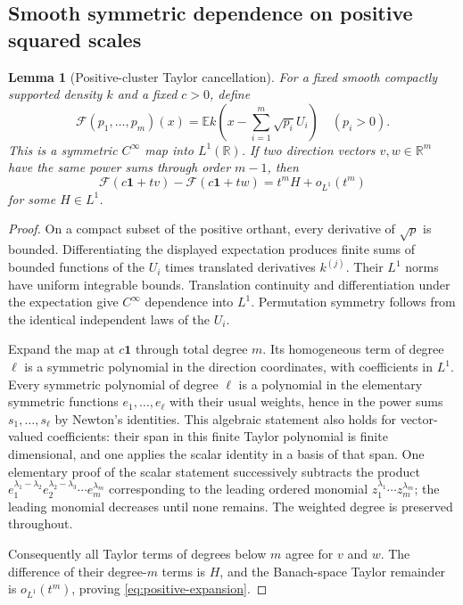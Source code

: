 \documentclass[11pt,a4paper]{article}
\numberwithin{equation}{section}
\newtheorem{lemma}[lemma]{Lemma}
\theoremstyle{definition}
\theoremstyle{remark}
\newcommand{\R}{\mathbb R}
\newcommand{\E}{\mathbb E}
\begin{document}
\subsection{Smooth symmetric dependence on positive squared scales}
\begin{lemma}[Positive-cluster Taylor cancellation]
\label{lem:positive-Taylor}
For a fixed smooth compactly supported density $k$ and a fixed $c>0$, define
\[
 \mathcal F(p_1,\ldots,p_m)(x)
 =\E k\left(x-\sum_{i=1}^m\sqrt{p_i}U_i\right)
 \quad(p_i>0).
\]
This is a symmetric $C^\infty$ map into $L^1(\R)$.  If two direction vectors
$v,w\in\R^m$ have the same power sums through order $m-1$, then
\begin{equation}
 \mathcal F(c\mathbf1+tv)-\mathcal F(c\mathbf1+tw)
 =t^m H+o_{L^1}(t^m)
 \label{eq:positive-expansion}
\end{equation}
for some $H\in L^1$.
\end{lemma}
\begin{proof}
On a compact subset of the positive orthant, every derivative of $\sqrt p$ is
bounded.  Differentiating the displayed expectation produces finite sums of
bounded functions of the $U_i$ times translated derivatives $k^{(j)}$.  Their
$L^1$ norms have uniform integrable bounds.  Translation continuity and
differentiation under the expectation give $C^\infty$ dependence into $L^1$.
Permutation symmetry follows from the identical independent laws of the $U_i$.

Expand the map at $c\mathbf1$ through total degree $m$.  Its homogeneous term of
degree $\ell$ is a symmetric polynomial in the direction coordinates, with
coefficients in $L^1$.  Every symmetric polynomial of degree $\ell$ is a
polynomial in the elementary symmetric functions $e_1,\ldots,e_\ell$ with their
usual weights, hence in the power sums $s_1,\ldots,s_\ell$ by Newton's identities.
This algebraic statement also holds for vector-valued coefficients: their span
in this finite Taylor polynomial is finite dimensional, and one applies the
scalar identity in a basis of that span.  One elementary proof of the scalar
statement successively subtracts the product
$e_1^{\lambda_1-\lambda_2}e_2^{\lambda_2-\lambda_3}\cdots e_m^{\lambda_m}$
corresponding to the leading ordered monomial $z_1^{\lambda_1}\cdots z_m^{\lambda_m}$;
the leading monomial decreases until none remains.  The weighted degree is
preserved throughout.

Consequently all Taylor terms of degrees below $m$ agree for $v$ and $w$.
The difference of their degree-$m$ terms is $H$, and the Banach-space Taylor
remainder is $o_{L^1}(t^m)$, proving \eqref{eq:positive-expansion}.
\end{proof}
\end{document}
